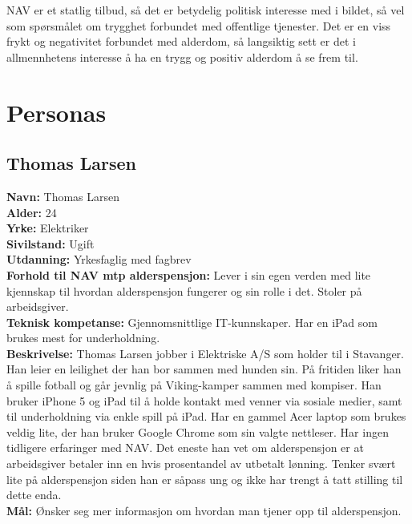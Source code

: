 \documentclass[informationsecurity]{gucmasterproject}
\begin{document}
NAV er et statlig tilbud, så det er betydelig politisk interesse med i bildet, så vel som spørsmålet om trygghet forbundet med offentlige tjenester. Det er en viss frykt og negativitet forbundet med alderdom, så langsiktig sett er det i allmennhetens interesse å ha en trygg og positiv alderdom å se frem til.



\section{Personas}
\subsection{Thomas Larsen}
\textbf{Navn:} Thomas Larsen \\
\textbf{Alder:} 24 \\
\textbf{Yrke:} Elektriker \\
\textbf{Sivilstand:} Ugift \\
\textbf{Utdanning:} Yrkesfaglig med fagbrev \\
\textbf{Forhold til NAV mtp alderspensjon:} Lever i sin egen verden med lite kjennskap til hvordan alderspensjon fungerer og sin rolle i det. Stoler på arbeidsgiver. \\
\textbf{Teknisk kompetanse:} Gjennomsnittlige IT-kunnskaper. Har en iPad som brukes mest for underholdning. \\
\textbf{Beskrivelse:} Thomas Larsen jobber i Elektriske A/S som holder til i Stavanger. Han leier en leilighet der han bor sammen med hunden sin. På fritiden liker han å spille fotball og går jevnlig på Viking-kamper sammen med kompiser. Han bruker iPhone 5 og iPad til å holde kontakt med venner via sosiale medier, samt til underholdning via enkle spill på iPad. Har en gammel Acer laptop som brukes veldig lite, der han bruker Google Chrome som sin valgte nettleser. Har ingen tidligere erfaringer med NAV. Det eneste han vet om alderspensjon er at arbeidsgiver betaler inn en hvis prosentandel av utbetalt lønning. Tenker svært lite på alderspensjon siden han er såpass ung og ikke har trengt å tatt stilling til dette enda. \\
\textbf{Mål:} Ønsker seg mer informasjon om hvordan man tjener opp til alderspensjon. \\
\end{document}
